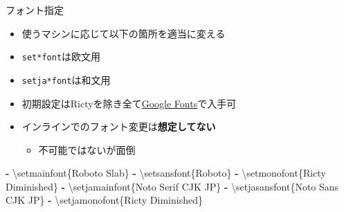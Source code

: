 \documentclass[
  12pt,
  ignorenonframetext,
]{beamer}
\newenvironment{Shaded}{\begin{snugshade}}{\end{snugshade}}
\newcommand{\AttributeTok}[1]{\textcolor[rgb]{0.77,0.63,0.00}{#1}}
\newcommand{\KeywordTok}[1]{\textcolor[rgb]{0.13,0.29,0.53}{\textbf{#1}}}
\providecommand{\tightlist}{%
  \setlength{\itemsep}{0pt}\setlength{\parskip}{0pt}}
\begin{document}
\begin{frame}[fragile]{フォント指定}
\protect\hypertarget{ux30d5ux30a9ux30f3ux30c8ux6307ux5b9a}{}

\begin{itemize}
\tightlist
\item
  使うマシンに応じて以下の箇所を適当に変える
\item
  \texttt{set*font}は欧文用
\item
  \texttt{setja*font}は和文用
\item
  初期設定はRictyを除き全て\href{https://fonts.google.com/?category=Sans+Serif\#standard-styles}{Google
  Fonts}で入手可
\item
  インラインでのフォント変更は\textbf{想定してない}

  \begin{itemize}
  \tightlist
  \item
    不可能ではないが面倒
  \end{itemize}
\end{itemize}

\begin{Shaded}
\begin{Highlighting}[]
\KeywordTok{-}\AttributeTok{ \textbackslash{}setmainfont\{Roboto Slab\}}
\KeywordTok{-}\AttributeTok{ \textbackslash{}setsansfont\{Roboto\}}
\KeywordTok{-}\AttributeTok{ \textbackslash{}setmonofont\{Ricty Diminished\}}
\KeywordTok{-}\AttributeTok{ \textbackslash{}setjamainfont\{Noto Serif CJK JP\}}
\KeywordTok{-}\AttributeTok{ \textbackslash{}setjasansfont\{Noto Sans CJK JP\}}
\KeywordTok{-}\AttributeTok{ \textbackslash{}setjamonofont\{Ricty Diminished\}}
\end{Highlighting}
\end{Shaded}

\end{frame}
\end{document}
